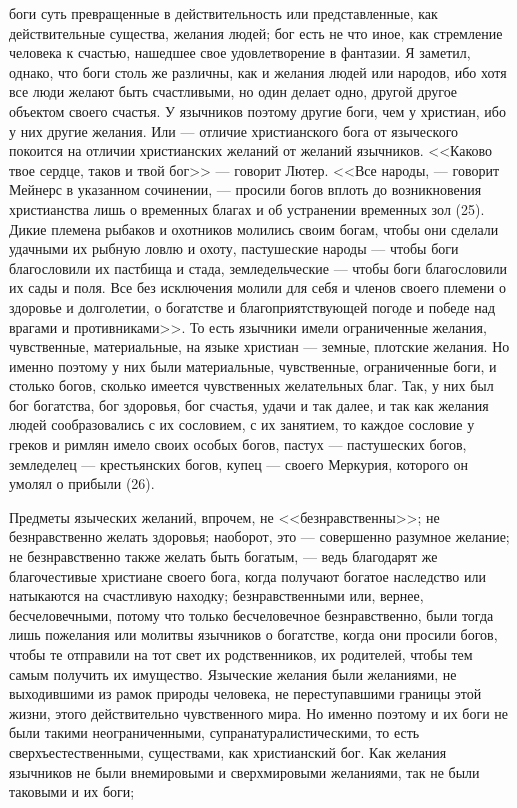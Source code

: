 \documentclass[12pt]{article}
\begin{document}
боги суть превращенные в действительность или представленные, как действительные существа, желания людей; бог есть не что иное, как стремление человека к счастью, нашедшее свое удовлетворение в фантазии. Я заметил, однако, что боги столь же различны, как и желания людей или народов, ибо хотя все люди желают быть счастливыми, но один делает одно, другой другое объектом своего счастья. У язычников поэтому другие боги, чем у христиан, ибо у них другие желания. Или --- отличие христианского бога от языческого покоится на отличии христианских желаний от желаний язычников. <<Каково твое сердце, таков и твой бог>>  --- говорит Лютер. <<Все народы, --- говорит Мейнерс в указанном сочинении, --- просили богов вплоть до возникновения христианства лишь о временных благах и об устранении временных зол (25). Дикие племена рыбаков и охотников молились своим богам, чтобы они сделали удачными их рыбную ловлю и охоту, пастушеские народы --- чтобы боги благословили их пастбища и стада, земледельческие --- чтобы боги благословили их сады и поля. Все без исключения молили для себя и членов своего племени о здоровье и долголетии, о богатстве и благоприятствующей погоде и победе над врагами и противниками>>. То есть язычники имели ограниченные желания, чувственные, материальные, на языке христиан --- земные, плотские желания. Но именно поэтому у них были материальные, чувственные, ограниченные боги, и столько богов, сколько имеется чувственных желательных благ. Так, у них был бог богатства, бог здоровья, бог счастья, удачи и так далее, и так как желания людей сообразовались с их сословием, с их занятием, то каждое сословие у греков и римлян имело своих особых богов, пастух --- пастушеских богов, земледелец --- крестьянских богов, купец --- своего Меркурия, которого он умолял о прибыли (26). 

Предметы языческих желаний, впрочем, не <<безнравственны>>; не безнравственно желать здоровья; наоборот, это --- совершенно разумное желание; не безнравственно также желать быть богатым, --- ведь благодарят же благочестивые христиане своего бога, когда получают богатое наследство или натыкаются на счастливую находку; безнравственными или, вернее, бесчеловечными, потому что только бесчеловечное безнравственно, были тогда лишь пожелания или молитвы язычников о богатстве, когда они просили богов, чтобы те отправили на тот свет их родственников, их родителей, чтобы тем самым получить их имущество. Языческие желания были желаниями, не выходившими из рамок природы человека, не переступавшими границы этой жизни, этого действительно чувственного мира. Но именно поэтому и их боги не были такими неограниченными, супранатуралистическими, то есть сверхъестественными, существами, как христианский бог. Как желания язычников не были внемировыми и сверхмировыми желаниями, так не были таковыми и их боги; 
\end{document}
